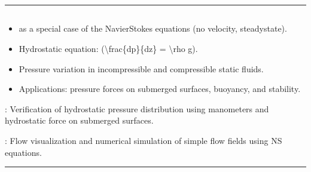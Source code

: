 \documentclass[letterpaper,10pt,english]{jupyterBook}
\begin{document}
\bigskip\hrule\bigskip



\subsection{}
\label{\detokenize{syllabus:weeks-7-8-fluid-statics-as-an-application-of-navier-stokes}}\begin{itemize}
\item {} 
\sphinxAtStartPar
{} as a special case of the Navier\sphinxhyphen{}Stokes equations (no velocity, steady\sphinxhyphen{}state).

\item {} 
\sphinxAtStartPar
Hydrostatic equation: (\textbackslash{}frac\{dp\}\{dz\} = \sphinxhyphen{}\textbackslash{}rho g).

\item {} 
\sphinxAtStartPar
Pressure variation in incompressible and compressible static fluids.

\item {} 
\sphinxAtStartPar
Applications: pressure forces on submerged surfaces, buoyancy, and stability.

\end{itemize}

\sphinxAtStartPar
{}: Verification of hydrostatic pressure distribution using manometers and hydrostatic force on submerged surfaces.

\sphinxAtStartPar
{}: Flow visualization and numerical simulation of simple flow fields using NS equations.


\bigskip\hrule\bigskip
\end{document}
